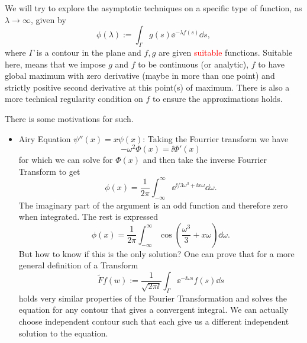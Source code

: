 We will try to explore the asymptotic techniques on a specific type of function, as $\lambda \rightarrow \infty$, given by 
\begin{equation}
	\phi(\lambda) := \int_{\Gamma} g(s) \ee^{-\lambda f(s)} \dd s,
\end{equation}
where $\Gamma$ is a contour in the plane and $f, g$ are given \textcolor{red}{suitable} functions. Suitable here, means that we impose $g$ and $f$ to be continuous (or analytic), $f$ to have global maximum with zero derivative (maybe in more than one point) and strictly positive second derivative at this point(s) of maximum. There is also a more technical regularity condition on $f$ to ensure the approximations holds.

There is some motivations for such.

\begin{itemize}
	\item Airy Equation $\psi''(x) = x \psi(x)$: Taking the Fourrier transform we have $$-\omega^2 \Phi(x) = \ii \Phi'(x)$$ for which we can solve for $\Phi(x) $ and then take the inverse Fourrier Transform to get $$\phi(x) = \frac{1}{2\pi} \int_{-\infty}^{\infty} \ee^{\ii/3 \omega^3 + \ii x \omega} \dd \omega.$$ The imaginary part of the argument is an odd function and therefore zero when integrated. The rest is expressed $$\phi(x) = \frac{1}{2\pi} \int_{-\infty}^{\infty} \cos{\left( \frac{\omega^3}{3} + x \omega \right)} \dd \omega.$$ But how to know if this is the only solution? One can prove that for a more general definition of a Transform $$\tilde{F} f(w) := \frac{1}{\sqrt{2\pi \ii}} \int_{\Gamma} \ee^{-\ii \omega s} f(s) \dd s$$ holds very similar properties of the Fourier Transformation and solves the equation for any contour that gives a convergent integral. We can actually choose independent contour such that each give us a different independent solution to the equation.
\end{itemize}